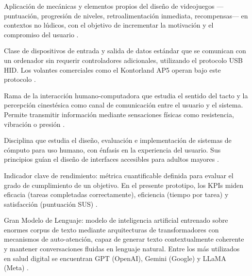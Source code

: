 \begin{description}[leftmargin=0pt, labelwidth=\textwidth, 
                    labelsep=0pt, style=nextline]
\item[\textbf{Gamificación}]
Aplicación de mecánicas y elementos propios del diseño de videojuegos 
—puntuación, progresión de niveles, retroalimentación inmediata, 
recompensas— en contextos no lúdicos, con el objetivo de incrementar la 
motivación y el compromiso del usuario \parencite{abd, Ortega2024}.

\item[\textbf{HID (\textit{Human Interface Device})}]
Clase de dispositivos de entrada y salida de datos estándar que se 
comunican con un ordenador sin requerir controladores adicionales, 
utilizando el protocolo USB HID. Los volantes comerciales como el 
Kontorland AP5 operan bajo este protocolo \parencite{Adilkhanov2022}.

\item[\textbf{Háptica}]
Rama de la interacción humano-computadora que estudia el sentido del tacto 
y la percepción cinestésica como canal de comunicación entre el usuario y 
el sistema. Permite transmitir información mediante sensaciones físicas 
como resistencia, vibración o presión \parencite{Marchal2008, 
Adilkhanov2022}.

\item[\textbf{IHC (Interacción Humano-Computadora)}]
Disciplina que estudia el diseño, evaluación e implementación de sistemas 
de cómputo para uso humano, con énfasis en la experiencia del usuario. 
Sus principios guían el diseño de interfaces accesibles para adultos 
mayores \parencite{Peres2022SUS}.

\item[\textbf{KPI (\textit{Key Performance Indicator})}]
Indicador clave de rendimiento: métrica cuantificable definida para 
evaluar el grado de cumplimiento de un objetivo. En el presente prototipo, 
los KPIs miden eficacia (tareas completadas correctamente), eficiencia 
(tiempo por tarea) y satisfacción (puntuación SUS) \parencite{Peres2022SUS, 
Ortega2024}.

\item[\textbf{LLM (\textit{Large Language Model})}]
Gran Modelo de Lenguaje: modelo de inteligencia artificial entrenado sobre 
enormes corpus de texto mediante arquitecturas de transformadores con 
mecanismos de auto-atención, capaz de generar texto contextualmente 
coherente y mantener conversaciones fluidas en lenguaje natural. Entre los 
más utilizados en salud digital se encuentran GPT (OpenAI), Gemini 
(Google) y LLaMA (Meta) \parencite{moret, Hamdi2025}.


\end{description}
